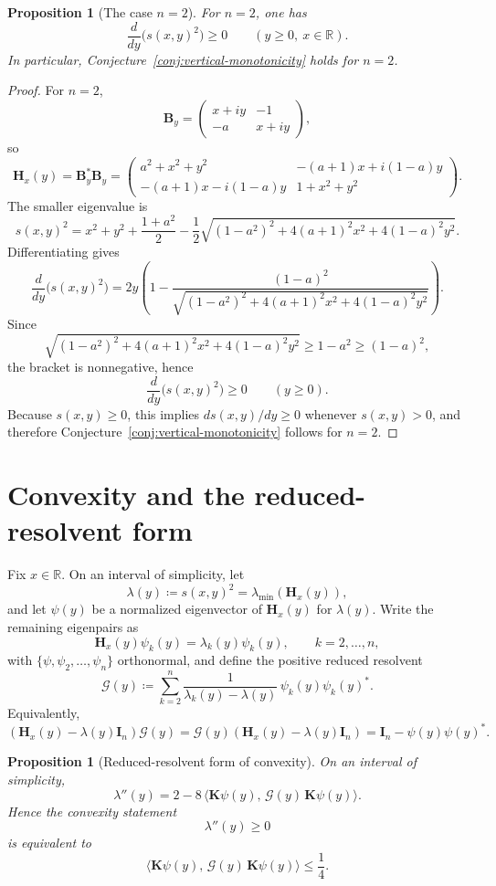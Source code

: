 \documentclass[11pt]{article}
\newtheorem{proposition}[theorem]{Proposition}
\begin{document}
\begin{proposition}[The case \(n=2\)]\label{prop:n=2}
For \(n=2\), one has
\[
\frac{d}{dy}\bigl(s(x,y)^2\bigr)\ge 0
\qquad (y\ge 0,\ x\in\mathbb R).
\]
In particular, Conjecture~\ref{conj:vertical-monotonicity} holds for \(n=2\).
\end{proposition}

\begin{proof}
For \(n=2\),
\[
\mathbf B_y=
\begin{pmatrix}
x+iy & -1\\
-a & x+iy
\end{pmatrix},
\]
so
\[
\mathbf H_x(y)=\mathbf B_y^*\mathbf B_y=
\begin{pmatrix}
a^2+x^2+y^2 & -(a+1)x+i(1-a)y\\
-(a+1)x-i(1-a)y & 1+x^2+y^2
\end{pmatrix}.
\]
The smaller eigenvalue is
\[
s(x,y)^2
=
x^2+y^2+\frac{1+a^2}{2}
-\frac12\sqrt{(1-a^2)^2+4(a+1)^2x^2+4(1-a)^2y^2}.
\]
Differentiating gives
\[
\frac{d}{dy}\bigl(s(x,y)^2\bigr)
=
2y\left(
1-\frac{(1-a)^2}{
\sqrt{(1-a^2)^2+4(a+1)^2x^2+4(1-a)^2y^2}}
\right).
\]
Since
\[
\sqrt{(1-a^2)^2+4(a+1)^2x^2+4(1-a)^2y^2}\ge 1-a^2\ge (1-a)^2,
\]
the bracket is nonnegative, hence
\[
\frac{d}{dy}\bigl(s(x,y)^2\bigr)\ge 0
\qquad (y\ge 0).
\]
Because \(s(x,y)\ge 0\), this implies \(d s(x,y)/dy\ge 0\) whenever \(s(x,y)>0\), and therefore Conjecture~\ref{conj:vertical-monotonicity} follows for \(n=2\).
\end{proof}

\section{Convexity and the reduced-resolvent form}

Fix \(x\in\mathbb R\).  On an interval of simplicity, let
\[
\lambda(y)\coloneqq s(x,y)^2=\lambda_{\min}(\mathbf H_x(y)),
\]
and let \(\psi(y)\) be a normalized eigenvector of \(\mathbf H_x(y)\) for \(\lambda(y)\). Write the remaining eigenpairs as
\[
\mathbf H_x(y)\psi_k(y)=\lambda_k(y)\psi_k(y),
\qquad
k=2,\dots,n,
\]
with \(\{\psi,\psi_2,\dots,\psi_n\}\) orthonormal, and define the positive reduced resolvent
\[
\mathcal G(y)\coloneqq \sum_{k=2}^n \frac{1}{\lambda_k(y)-\lambda(y)}\,\psi_k(y)\psi_k(y)^*.
\]
Equivalently,
\[
(\mathbf H_x(y)-\lambda(y)\mathbf I_n)\mathcal G(y)=\mathcal G(y)(\mathbf H_x(y)-\lambda(y)\mathbf I_n)=\mathbf I_n-\psi(y)\psi(y)^*.
\]

\begin{proposition}[Reduced-resolvent form of convexity]\label{prop:reduced-resolvent}
On an interval of simplicity,
\[
\lambda''(y)
=
2-8\,\bigl\langle \mathbf K\psi(y),\,\mathcal G(y)\,\mathbf K\psi(y)\bigr\rangle.
\]
Hence the convexity statement
\[
\lambda''(y)\ge 0
\]
is equivalent to
\[
\boxed{
\bigl\langle \mathbf K\psi(y),\,\mathcal G(y)\,\mathbf K\psi(y)\bigr\rangle\le \frac14.
}
\]
\end{proposition}
\end{document}
